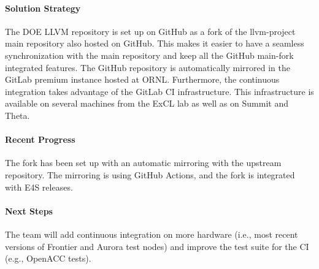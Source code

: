 \paragraph{Solution Strategy}


The DOE LLVM repository is set up on GitHub as a fork of the llvm-project
      main repository also hosted on GitHub. This makes it easier to have a
      seamless synchronization with the main repository and keep all the
      GitHub main-fork integrated features.
%
The GitHub repository is automatically mirrored in the GitLab premium
      instance hosted at ORNL.
%
Furthermore, the continuous integration takes advantage of the GitLab CI infrastructure.
      This infrastructure is available on several machines from the ExCL lab as
      well as on Summit and Theta.



\paragraph{Recent Progress}

The fork has been set up with an automatic mirroring with the upstream repository.
The mirroring is using GitHub Actions, and the fork is integrated with E4S releases.


\paragraph{Next Steps}

The team will add continuous integration on more hardware (i.e., most recent versions of Frontier and Aurora test nodes) and
improve the test suite for the CI (e.g., OpenACC tests).
